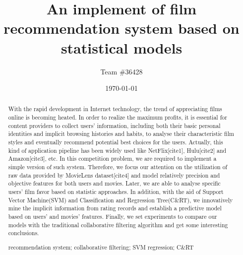 \documentclass[a4paper,11pt]{article}
\title{An implement of film recommendation system based on statistical models}
\author{Team \#36428}
\date{\today}
\begin{document}
\begin{abstract}
  With the rapid development in Internet technology, the trend of appreciating films online is becoming heated. In order to realize the maximum profits, it is essential for content providers to collect users' information, including both their basic personal identities and implicit  browsing histories and habits, to analyse their characteristic film styles and eventually recommend potential best choices for the users. Actually, this kind of application pipeline has been widely used like NetFlix[cite1], Hulu[cite2] and Amazon[cite3], etc. 
  In this competition problem, we are required to implement a simple version of such system. Therefore, we focus our attention on the utilization of raw data provided by MovieLens dataset[cite4] and model relatively precision and objective features for both users and movies. Later, we are able to analyse specific users'  film favor based on statistic approaches. In addition, with the aid of Support Vector Machine(SVM) and Classification and Regression Tree(C\&RT), we innovatively mine the implicit information from rating records and establish a predictive model based on users' and movies' features. Finally, we set experiments to compare our models with the traditional collaborative filtering algorithm and get some interesting conclusions. 
  
\begin{keywords}
recommendation system; collaborative filtering; SVM regression; C\&RT
\end{keywords}
\end{abstract}

\maketitle
\pagestyle{empty}
%
\newpage                                                          %


\tableofcontents                                                  %
\newpage
\pagestyle{fancy}                                                     %

\end{document}
